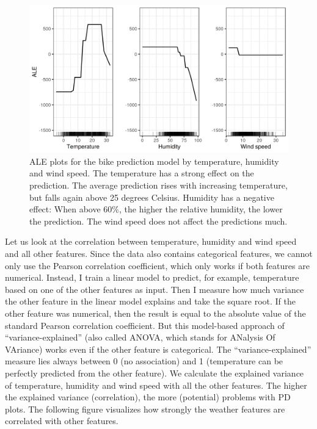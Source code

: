 \documentclass[12pt,]{krantz}
\begin{document}
\begin{figure}

{\centering \includegraphics[width=\textwidth]{images/ale-bike-1} 

}

\caption{ALE plots for the bike prediction model by temperature, humidity and wind speed. The temperature has a strong effect on the prediction. The average prediction rises with increasing temperature, but falls again above 25 degrees Celsius. Humidity has a negative effect: When above 60\%, the higher the relative humidity, the lower the prediction. The wind speed does not affect the predictions much.}\label{fig:ale-bike}
\end{figure}

Let us look at the correlation between temperature, humidity and wind
speed and all other features. Since the data also contains categorical
features, we cannot only use the Pearson correlation coefficient, which
only works if both features are numerical. Instead, I train a linear
model to predict, for example, temperature based on one of the other
features as input. Then I measure how much variance the other feature in
the linear model explains and take the square root. If the other feature
was numerical, then the result is equal to the absolute value of the
standard Pearson correlation coefficient. But this model-based approach
of ``variance-explained'' (also called ANOVA, which stands for ANalysis
Of VAriance) works even if the other feature is categorical. The
``variance-explained'' measure lies always between 0 (no association)
and 1 (temperature can be perfectly predicted from the other feature).
We calculate the explained variance of temperature, humidity and wind
speed with all the other features. The higher the explained variance
(correlation), the more (potential) problems with PD plots. The
following figure visualizes how strongly the weather features are
correlated with other features.
\end{document}
